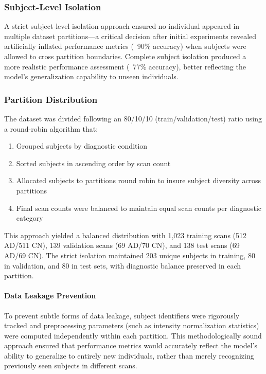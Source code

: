 \documentclass[12pt, a4paper]{article}
\begin{document}
\subsubsection{Subject-Level Isolation}

A strict subject-level isolation approach ensured no individual appeared in multiple dataset partitions—a critical decision after initial experiments revealed artificially inflated performance metrics (~90\% accuracy) when subjects were allowed to cross partition boundaries. Complete subject isolation produced a more realistic performance assessment (~77\% accuracy), better reflecting the model's generalization capability to unseen individuals.

\subsubsection{Partition Distribution}

The dataset was divided following an 80/10/10 (train/validation/test) ratio using a round-robin algorithm that:
\begin{enumerate}
    \item Grouped subjects by diagnostic condition
    \item Sorted subjects in ascending order by scan count
    \item Allocated subjects to partitions round robin to insure subject diversity across partitions
    \item Final scan counts were balanced to maintain equal scan counts per diagnostic category
\end{enumerate}

This approach yielded a balanced distribution with 1,023 training scans (512 AD/511 CN), 139 validation scans (69 AD/70 CN), and 138 test scans (69 AD/69 CN). The strict isolation maintained 203 unique subjects in training, 80 in validation, and 80 in test sets, with diagnostic balance preserved in each partition.

\paragraph{Data Leakage Prevention}

To prevent subtle forms of data leakage, subject identifiers were rigorously tracked and preprocessing parameters (such as intensity normalization statistics) were computed independently within each partition. This methodologically sound approach ensured that performance metrics would accurately reflect the model's ability to generalize to entirely new individuals, rather than merely recognizing previously seen subjects in different scans.
\end{document}
